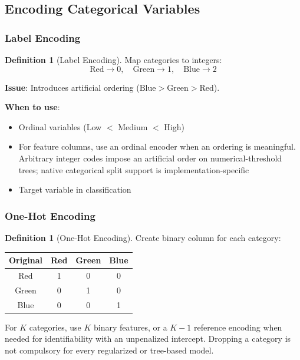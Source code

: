 \documentclass[11pt,twoside]{article}
\numberwithin{equation}{section}
\theoremstyle{plain}
\theoremstyle{definition}
\newtheorem{definition}[theorem]{Definition}
\theoremstyle{remark}
\begin{document}
\subsection{Encoding Categorical Variables}

\subsubsection{Label Encoding}

\begin{definition}[Label Encoding]
Map categories to integers:
\[
\text{Red} \to 0, \quad \text{Green} \to 1, \quad \text{Blue} \to 2
\]

\textbf{Issue}: Introduces artificial ordering ($\text{Blue} > \text{Green} > \text{Red}$).

\textbf{When to use}:
\begin{itemize}
\item Ordinal variables (Low $<$ Medium $<$ High)
\item For feature columns, use an ordinal encoder when an ordering is meaningful. Arbitrary integer codes impose an artificial order on numerical-threshold trees; native categorical split support is implementation-specific
\item Target variable in classification
\end{itemize}
\end{definition}

\subsubsection{One-Hot Encoding}

\begin{definition}[One-Hot Encoding]
Create binary column for each category:

\begin{center}
\begin{tabular}{c|ccc}
Original & Red & Green & Blue \\
\hline
Red & 1 & 0 & 0 \\
Green & 0 & 1 & 0 \\
Blue & 0 & 0 & 1 \\
\end{tabular}
\end{center}

For $K$ categories, use $K$ binary features, or a $K-1$ reference encoding when needed for identifiability with an unpenalized intercept. Dropping a category is not compulsory for every regularized or tree-based model.
\end{definition}
\end{document}
